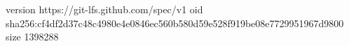 version https://git-lfs.github.com/spec/v1
oid sha256:cf4df2d37c48c4980e4e0846ec560b580d59e528f919be08e7729951967d9800
size 1398288
